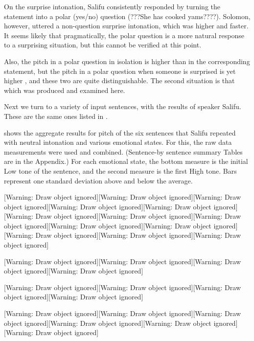 \documentclass[output=paper]{langsci/langscibook}
\begin{document}
On the surprise intonation, Salifu consistently responded by turning the statement into a polar (yes/no) question (???She has cooked yams????). Solomon, however, uttered a non-question surprise intonation, which was higher and faster. It seems likely that pragmatically, the polar question is a more natural response to a surprising situation, but this cannot be verified at this point. 

Also, the pitch in a polar question in isolation is higher than in the corresponding statement, but the pitch in a polar question when someone is surprised is yet higher \citep{Cahill2012}, and these two are quite distinguishable. The second situation is that which was produced and examined here.

\begin{styleBodyTextIndent}
Next we turn to a variety of input sentences, with the results of speaker Salifu. These are the same ones listed in .
\end{styleBodyTextIndent}

 shows the aggregate results for pitch of the six sentences that Salifu repeated with neutral intonation and various emotional states. For this, the raw data measurements were used and combined. (Sentence-by sentence summary Tables are in the Appendix.) For each emotional state, the bottom measure is the initial Low tone of the sentence, and the second measure is the first High tone. Bars represent one standard deviation above and below the average.

[Warning: Draw object ignored][Warning: Draw object ignored][Warning: Draw object ignored][Warning: Draw object ignored][Warning: Draw object ignored][Warning: Draw object ignored][Warning: Draw object ignored][Warning: Draw object ignored][Warning: Draw object ignored][Warning: Draw object ignored][Warning: Draw object ignored][Warning: Draw object ignored][Warning: Draw object ignored]

[Warning: Draw object ignored][Warning: Draw object ignored][Warning: Draw object ignored][Warning: Draw object ignored]

[Warning: Draw object ignored][Warning: Draw object ignored][Warning: Draw object ignored][Warning: Draw object ignored]

[Warning: Draw object ignored][Warning: Draw object ignored][Warning: Draw object ignored][Warning: Draw object ignored][Warning: Draw object ignored][Warning: Draw object ignored]
\end{document}

